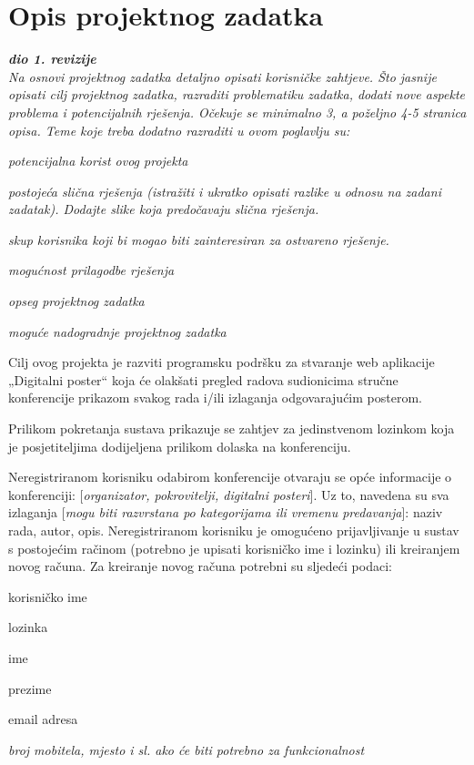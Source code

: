 \chapter{Opis projektnog zadatka}
		
		\textbf{\textit{dio 1. revizije}}\\
		
		\textit{Na osnovi projektnog zadatka detaljno opisati korisničke zahtjeve. Što jasnije opisati cilj projektnog zadatka, razraditi problematiku zadatka, dodati nove aspekte problema i potencijalnih rješenja. Očekuje se minimalno 3, a poželjno 4-5 stranica opisa.	Teme koje treba dodatno razraditi u ovom poglavlju su:}
		\begin{packed_item}
			\item \textit{potencijalna korist ovog projekta}
			\item \textit{postojeća slična rješenja (istražiti i ukratko opisati razlike u odnosu na zadani zadatak). Dodajte slike koja predočavaju slična rješenja.}
			\item \textit{skup korisnika koji bi mogao biti zainteresiran za ostvareno rješenje.}
			\item \textit{mogućnost prilagodbe rješenja }
			\item \textit{opseg projektnog zadatka}
			\item \textit{moguće nadogradnje projektnog zadatka}
		\end{packed_item}
		
		Cilj ovog projekta je razviti programsku podršku za stvaranje web aplikacije „Digitalni poster“ koja će olakšati pregled radova sudionicima stručne konferencije prikazom svakog rada i/ili izlaganja odgovarajućim posterom. 
		
		Prilikom pokretanja sustava prikazuje se zahtjev za jedinstvenom lozinkom koja je posjetiteljima dodijeljena prilikom dolaska na konferenciju.
		
		Neregistriranom korisniku odabirom konferencije otvaraju se opće informacije o konferenciji: [\textit{organizator, pokrovitelji, digitalni posteri}]. Uz to, navedena su sva izlaganja [\textit{mogu biti razvrstana po kategorijama ili vremenu predavanja}]: naziv rada, autor, opis. Neregistriranom korisniku je omogućeno prijavljivanje u sustav s postojećim račinom (potrebno je upisati korisničko ime i lozinku) ili kreiranjem novog računa. Za kreiranje novog računa potrebni su sljedeći podaci:
		\begin{packed_item}
			\item korisničko ime
			\item lozinka
			\item ime
			\item prezime
			\item email adresa
			\item \textit{broj mobitela, mjesto i sl. ako će biti potrebno za funkcionalnost}
		\end{packed_item}
		
